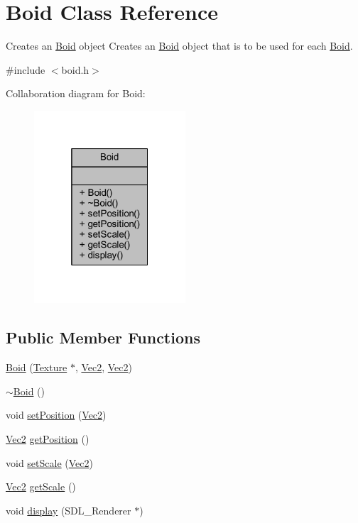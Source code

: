 \hypertarget{class_boid}{\section{Boid Class Reference}
\label{class_boid}
}


Creates an \hyperlink{class_boid}{Boid} object Creates an \hyperlink{class_boid}{Boid} object that is to be used for each \hyperlink{class_boid}{Boid}.  




{\ttfamily \#include $<$boid.\+h$>$}



Collaboration diagram for Boid\+:\nopagebreak
\begin{figure}[H]
\begin{center}
\leavevmode
\includegraphics[width=160pt]{class_boid__coll__graph}
\end{center}
\end{figure}
\subsection*{Public Member Functions}
\begin{DoxyCompactItemize}
\item 
\hyperlink{class_boid_aa0c991f0bbe21209e22fcf81002dab11}{Boid} (\hyperlink{class_texture}{Texture} $\ast$, \hyperlink{struct_vec2}{Vec2}, \hyperlink{struct_vec2}{Vec2})
\item 
\hyperlink{class_boid_a712f84ddc1b8ad06ad7ecd6c10a1666c}{$\sim$\+Boid} ()
\item 
void \hyperlink{class_boid_a62ebe99b4a19edfc2d0a6f1ac58e9658}{set\+Position} (\hyperlink{struct_vec2}{Vec2})
\item 
\hyperlink{struct_vec2}{Vec2} \hyperlink{class_boid_a4f21bfa041637ffcce13c56764fd3c9f}{get\+Position} ()
\item 
void \hyperlink{class_boid_a4443fb5d1fb425b9fede21c3cee2ba84}{set\+Scale} (\hyperlink{struct_vec2}{Vec2})
\item 
\hyperlink{struct_vec2}{Vec2} \hyperlink{class_boid_a3a5d507c214ebd3bf9eda04e2157c4b5}{get\+Scale} ()
\item 
void \hyperlink{class_boid_ad522fbcf60e6e318c785ca7b04091472}{display} (S\+D\+L\+\_\+\+Renderer $\ast$)
\end{DoxyCompactItemize}


